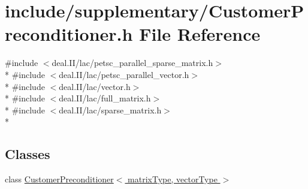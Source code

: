 \section{include/supplementary/\-Customer\-Preconditioner.h File Reference}
\label{_customer_preconditioner_8h}
{\ttfamily \#include $<$deal.\-I\-I/lac/petsc\-\_\-parallel\-\_\-sparse\-\_\-matrix.\-h$>$}\\*
{\ttfamily \#include $<$deal.\-I\-I/lac/petsc\-\_\-parallel\-\_\-vector.\-h$>$}\\*
{\ttfamily \#include $<$deal.\-I\-I/lac/vector.\-h$>$}\\*
{\ttfamily \#include $<$deal.\-I\-I/lac/full\-\_\-matrix.\-h$>$}\\*
{\ttfamily \#include $<$deal.\-I\-I/lac/sparse\-\_\-matrix.\-h$>$}\\*
\subsection*{Classes}
\begin{DoxyCompactItemize}
\item 
class \hyperlink{class_customer_preconditioner}{Customer\-Preconditioner$<$ matrix\-Type, vector\-Type $>$}
\end{DoxyCompactItemize}
